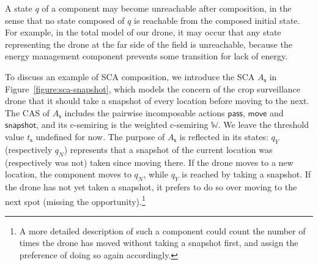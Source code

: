 \documentclass[a4paper]{article}
\newcommand{\wcsemiring}{\mathbb{W}}
\theoremstyle{definition}
\newcommand{\move}{\mathsf{move}}
\newcommand{\snapshot}{\mathsf{snapshot}}
\newcommand{\s}{\mathsf{s}}
\newcommand{\pass}{\mathsf{pass}}
\newcommand{\e}{\mathsf{e}}
\begin{document}

A state $q$ of a component may become unreachable after composition, in the sense that no state composed of $q$ is reachable from the composed initial state. For example, in the total model of our drone, it may occur that any state representing the drone at the far side of the field is unreachable, because the energy management component prevents some transition for lack of energy.

To discuss an example of SCA composition, we introduce the SCA $A_\s$ in Figure~\ref{figure:sca-snapshot}, which models the concern of the crop surveillance drone that it should take a snapshot of every location before moving to the next. The CAS of $A_\s$ includes the pairwise incomposable actions $\pass$, $\move$ and $\snapshot$, and its c-semiring is the weighted c-semiring $\wcsemiring$. We leave the threshold value $t_\s$ undefined for now. The purpose of $A_\s$ is reflected in its states: $q_Y$ (respectively $q_N$) represents that a snapshot of the current location was (respectively was not) taken since moving there. If the drone moves to a new location, the component moves to $q_N$, while $q_Y$ is reached by taking a snapshot. If the drone has not yet taken a snapshot, it prefers to do so over moving to the next spot (missing the opportunity).\footnote{A more detailed description of such a component could count the number of times the drone has moved without taking a snapshot first, and assign the preference of doing so again accordingly.}
\end{document}
